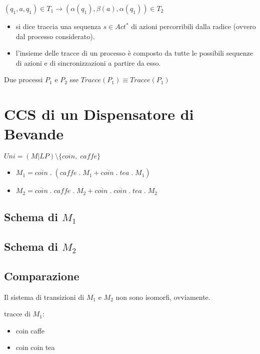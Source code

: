 $(q_1,a,q_1) \in T_1 \rightarrow (\alpha(q_1),\beta(a),\alpha(q_1)) \in T_2$

\begin{itemize}
  \item si dice traccia una sequenza $s \in Act^\ast$ di azioni percorribili dalla radice (ovvero dal processo considerato).
  \item l'insieme delle tracce di un processo \`e composto da tutte le possibili sequenze di azioni e di sincronizzazioni a partire da esso.
\end{itemize}

Due processi $P_1$ e $P_2$ sse $Tracce(P_1) \equiv Tracce(P_1)$

\section{CCS di un Dispensatore di Bevande}

$Uni = (M | LP) \setminus \{coin, \; caffe\}$

\begin{itemize}
  \item $M_1 = \overline {coin} \; . \; (caffe \; . \; M_1 + \overline {coin} \; . \; tea \; . \; M_1)$
  \item $M_2 = \overline {coin} \; . \; caffe \; . \; M_2 + \overline {coin} \; . \; \overline {coin} \; . \; tea \; . \; M_2$
\end{itemize}

\subsection{Schema di $M_1$}


\subsection{Schema di $M_2$}


\subsection{Comparazione}

Il sistema di transizioni di $M_1$ e $M_2$ non sono isomorfi, ovviamente.

tracce di $M_1$:
\begin{itemize}
  \item coin caffe
  \item coin coin tea
\end{itemize}

